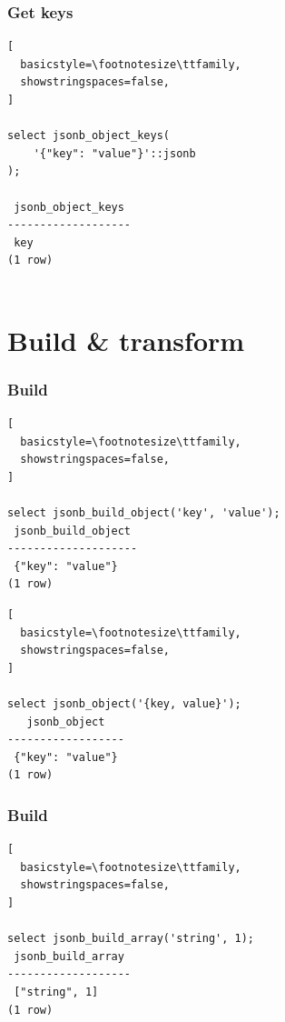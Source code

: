 \documentclass[14pt, compress, aspectratio=169]{beamer}
\begin{document}
\begin{frame}[fragile]
  \frametitle{Get keys}

\begin{lstlisting}[
  basicstyle=\footnotesize\ttfamily,
  showstringspaces=false,
]

select jsonb_object_keys(
    '{"key": "value"}'::jsonb
);

 jsonb_object_keys 
-------------------
 key
(1 row)
         
\end{lstlisting}

\end{frame}

\section{Build \& transform}

\begin{frame}[fragile]
  \frametitle{Build}

\begin{lstlisting}[
  basicstyle=\footnotesize\ttfamily,
  showstringspaces=false,
]

select jsonb_build_object('key', 'value');
 jsonb_build_object 
--------------------
 {"key": "value"}
(1 row)

\end{lstlisting}

\begin{lstlisting}[
  basicstyle=\footnotesize\ttfamily,
  showstringspaces=false,
]

select jsonb_object('{key, value}');
   jsonb_object   
------------------
 {"key": "value"}
(1 row)

\end{lstlisting}

\end{frame}

\begin{frame}[fragile]
  \frametitle{Build}

\begin{lstlisting}[
  basicstyle=\footnotesize\ttfamily,
  showstringspaces=false,
]

select jsonb_build_array('string', 1);                                                                                                                  
 jsonb_build_array 
-------------------
 ["string", 1]
(1 row)

\end{lstlisting}

\end{frame}
\end{document}
